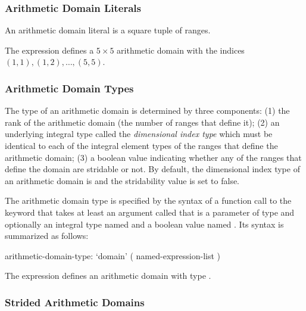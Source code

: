 \subsubsection{Arithmetic Domain Literals}
\label{Arithmetic_Domain_Literals}

An arithmetic domain literal is a square tuple of ranges.
\begin{example}
The expression \chpl{[1..5, 1..5]} defines a $5 \times 5$ arithmetic
domain with the indices $(1, 1), (1, 2), \ldots, (5, 5)$.
\end{example}

\subsubsection{Arithmetic Domain Types}
\label{Arithmetic_Domain_Types}

The type of an arithmetic domain is determined by three components:
(1) the rank of the arithmetic domain (the number of ranges that
define it); (2) an underlying integral type called the
\emph{dimensional index type} which must be identical to each of the
integral element types of the ranges that define the arithmetic
domain; (3) a boolean value indicating whether any of the ranges that
define the domain are stridable or not.  By default, the dimensional
index type of an arithmetic domain is  and the stridability
value is set to false.

The arithmetic domain type is specified by the syntax of a function
call to the keyword  that takes at least an argument
called  that is a parameter of type  and
optionally an integral type named  and a boolean value
named .  Its syntax is summarized as follows:
\begin{syntax}
arithmetic-domain-type:
  `domain' ( named-expression-list )
\end{syntax}

\begin{example}
The expression \chpl{[1..5, 1..5]} defines an arithmetic domain with
type .
\end{example}

\subsubsection{Strided Arithmetic Domains}
\label{Strided_Arithmetic_Domains_and_Arrays}

